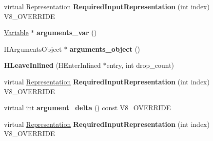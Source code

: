 \begin{DoxyCompactItemize}
\item 
\hypertarget{classv8_1_1internal_1_1_v8___f_i_n_a_l_a6c6d1f37f40b113d8f4062f1ffff7215}{}virtual \hyperlink{classv8_1_1internal_1_1_representation}{Representation} {\bfseries Required\+Input\+Representation} (int index) V8\+\_\+\+O\+V\+E\+R\+R\+I\+D\+E\label{classv8_1_1internal_1_1_v8___f_i_n_a_l_a6c6d1f37f40b113d8f4062f1ffff7215}

\item 
\hypertarget{classv8_1_1internal_1_1_v8___f_i_n_a_l_af91f19d0ce2a270c96fded5929fedaf2}{}\hyperlink{classv8_1_1internal_1_1_variable}{Variable} $\ast$ {\bfseries arguments\+\_\+var} ()\label{classv8_1_1internal_1_1_v8___f_i_n_a_l_af91f19d0ce2a270c96fded5929fedaf2}

\item 
\hypertarget{classv8_1_1internal_1_1_v8___f_i_n_a_l_a2e3b9166df20ef2936781f5834abaab0}{}H\+Arguments\+Object $\ast$ {\bfseries arguments\+\_\+object} ()\label{classv8_1_1internal_1_1_v8___f_i_n_a_l_a2e3b9166df20ef2936781f5834abaab0}

\item 
\hypertarget{classv8_1_1internal_1_1_v8___f_i_n_a_l_ab858b74da7dc1d0dc2d0a3a4cd02f37c}{}{\bfseries H\+Leave\+Inlined} (H\+Enter\+Inlined $\ast$entry, int drop\+\_\+count)\label{classv8_1_1internal_1_1_v8___f_i_n_a_l_ab858b74da7dc1d0dc2d0a3a4cd02f37c}

\item 
\hypertarget{classv8_1_1internal_1_1_v8___f_i_n_a_l_a6c6d1f37f40b113d8f4062f1ffff7215}{}virtual \hyperlink{classv8_1_1internal_1_1_representation}{Representation} {\bfseries Required\+Input\+Representation} (int index) V8\+\_\+\+O\+V\+E\+R\+R\+I\+D\+E\label{classv8_1_1internal_1_1_v8___f_i_n_a_l_a6c6d1f37f40b113d8f4062f1ffff7215}

\item 
\hypertarget{classv8_1_1internal_1_1_v8___f_i_n_a_l_a819f9fee628b487f878651a2f5b42a22}{}virtual int {\bfseries argument\+\_\+delta} () const V8\+\_\+\+O\+V\+E\+R\+R\+I\+D\+E\label{classv8_1_1internal_1_1_v8___f_i_n_a_l_a819f9fee628b487f878651a2f5b42a22}

\item 
\hypertarget{classv8_1_1internal_1_1_v8___f_i_n_a_l_a6c6d1f37f40b113d8f4062f1ffff7215}{}virtual \hyperlink{classv8_1_1internal_1_1_representation}{Representation} {\bfseries Required\+Input\+Representation} (int index) V8\+\_\+\+O\+V\+E\+R\+R\+I\+D\+E\label{classv8_1_1internal_1_1_v8___f_i_n_a_l_a6c6d1f37f40b113d8f4062f1ffff7215}


\end{DoxyCompactItemize}
